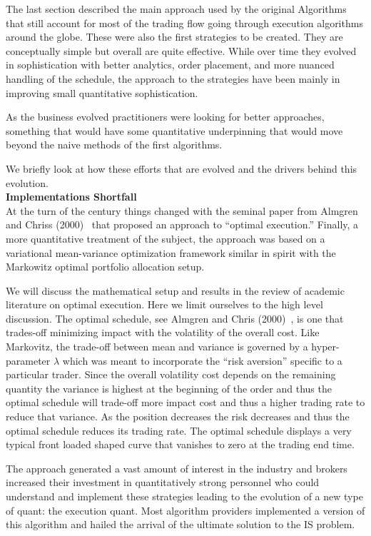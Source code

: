 The last section described the main approach used by the original Algorithms that still account for most of the trading flow going through execution algorithms around the globe. These were also the  first strategies to be created. They are conceptually simple but overall are quite effective. While over time they evolved in sophistication with better analytics, order placement, and more nuanced handling of the schedule, the approach to the strategies have been mainly in improving small quantitative sophistication.


As the business evolved practitioners were looking for better approaches, something that would have some quantitative underpinning that would move beyond the naive methods of the first algorithms.


We briefly look at how these efforts that are evolved and the drivers behind this evolution. \\


\noindent\textbf{Implementations Shortfall} \\


At the turn of the century things changed with the seminal paper from Almgren and Chriss (2000)~\cite{alm2000} that proposed an approach to ``optimal execution.'' Finally, a more quantitative treatment of the subject, the approach was based on a variational  mean-variance optimization framework similar in spirit with the Markowitz optimal portfolio allocation setup.



We will discuss the  mathematical setup and results in the review of  academic literature on optimal execution. Here we limit ourselves to the high level discussion. The optimal schedule, see Almgren and Chris (2000)~\cite{alm2000}, is one that trades-off minimizing impact with the volatility of the overall cost. Like Markovitz, the trade-off between mean and variance is governed by a hyper-parameter $\lambda$ which was meant to incorporate the ``risk aversion'' specific to a particular trader. Since the overall volatility cost depends on the remaining quantity the variance is highest at the beginning of the order and thus the optimal schedule will trade-off more impact cost and thus a higher trading rate to reduce that variance. As the position decreases the risk decreases and thus the optimal schedule reduces its trading rate. The optimal schedule displays a very typical front loaded shaped curve that vanishes to zero at the trading end time.


The approach generated a vast amount of interest in the industry and  brokers increased their investment in quantitatively strong personnel who could understand and implement these strategies leading to the evolution of a new type of quant: the execution quant. Most algorithm providers implemented a version of this algorithm and hailed the arrival of the ultimate solution to the IS problem. 


